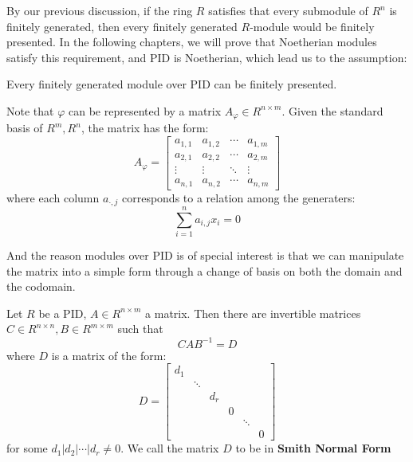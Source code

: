 \documentclass{note-eng}
\begin{document}
By our previous discussion, if the ring $R$ satisfies that every submodule of $R^n$ is finitely generated, then every finitely generated $R$-module would be finitely presented. In the following chapters, we will prove that Noetherian modules satisfy this requirement, and PID is Noetherian, which lead us to the assumption:

\begin{assumption}
    Every finitely generated module over PID can be finitely presented.
\end{assumption}

Note that $\varphi$ can be represented by a matrix $A_{\varphi} \in R^{n \times m}$. Given the standard basis of $R^m, R^n$, the matrix has the form:
$$A_{\varphi} = \begin{bmatrix}
    a_{1, 1} & a_{1, 2} & \cdots & a_{1, m} \\
    a_{2, 1} & a_{2, 2} & \cdots & a_{2, m} \\
    \vdots &\vdots &\ddots &\vdots \\
    a_{n, 1} & a_{n, 2} & \cdots & a_{n, m}
\end{bmatrix}$$
where each column $a_{\cdot, j}$ corresponds to a relation among the generaters:
$$\sum\limits_{i = 1}^{n} a_{i, j} x_i = 0$$

And the reason modules over PID is of special interest is that we can manipulate the matrix into a simple form through a change of basis on both the domain and the codomain.

\begin{proposition}
    Let $R$ be a PID, $A \in R^{n \times m}$ a matrix. Then there are invertible matrices $C \in R^{n \times n}, B \in R^{m \times m}$ such that
    $$C A B ^{-1} = D$$
    where $D$ is a matrix of the form:
    $$D = \begin{bmatrix}
        d_{1} \\
        & \ddots \\
        & & d_r \\
        & & & 0 \\
        & & & & \ddots \\
        & & & & & 0
    \end{bmatrix}$$
    for some $d_1 | d_2 | \cdots | d_r \ne 0$. We call the matrix $D$ to be in \textbf{Smith Normal Form}
\end{proposition}
\end{document}
